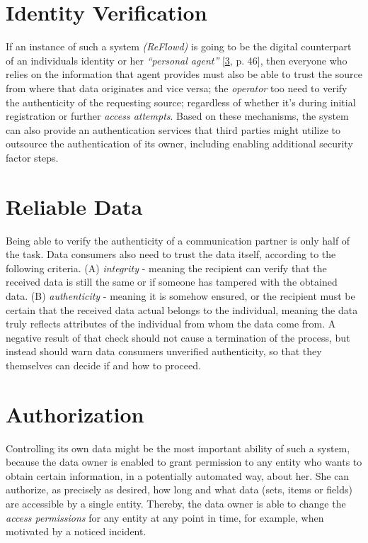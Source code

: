 \documentclass[12pt,english,a4paper,titlepage,cleardoublepage=empty,dottedtoc]{report}
\begin{document}
\section{Identity Verification}\label{identity-verification}

If an instance of such a system \emph{(ReFlowd)} is going to be the
digital counterpart of an individuals identity or her \emph{``personal
agent''} {[}\protect\hyperlink{ref-book_2015_ethical-it-innovation}{3},
p. 46{]}, then everyone who relies on the information that agent
provides must also be able to trust the source from where that data
originates and vice versa; the \emph{operator} too need to verify the
authenticity of the requesting source; regardless of whether it's during
initial registration or further \emph{access attempts}. Based on these
mechanisms, the system can also provide an authentication services that
third parties might utilize to outsource the authentication of its
owner, including enabling additional security factor steps.

\section{Reliable Data}\label{reliable-data}

Being able to verify the authenticity of a communication partner is only
half of the task. Data consumers also need to trust the data itself,
according to the following criteria. (A) \emph{integrity} - meaning the
recipient can verify that the received data is still the same or if
someone has tampered with the obtained data. (B) \emph{authenticity} -
meaning it is somehow ensured, or the recipient must be certain that the
received data actual belongs to the individual, meaning the data truly
reflects attributes of the individual from whom the data come from. A
negative result of that check should not cause a termination of the
process, but instead should warn data consumers unverified authenticity,
so that they themselves can decide if and how to proceed.

\section{Authorization}\label{authorization}

Controlling its own data might be the most important ability of such a
system, because the data owner is enabled to grant permission to any
entity who wants to obtain certain information, in a potentially
automated way, about her. She can authorize, as precisely as desired,
how long and what data (sets, items or fields) are accessible by a
single entity. Thereby, the data owner is able to change the
\emph{access permissions} for any entity at any point in time, for
example, when motivated by a noticed incident.
\end{document}
